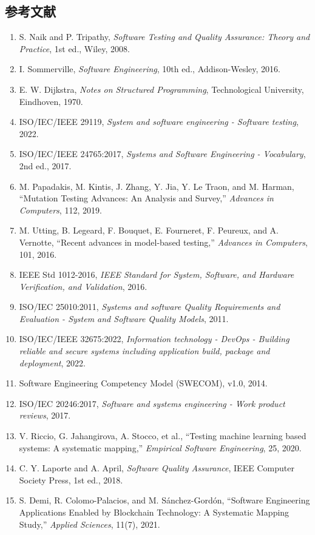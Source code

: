 \documentclass[a4paper,11pt]{ltjsarticle}
\numberwithin{figure}{section}
\numberwithin{table}{section}
\begin{document}
\subsection{参考文献}
\begin{enumerate}[leftmargin=2.2em]
\item S. Naik and P. Tripathy, \textit{Software Testing and Quality Assurance: Theory and Practice}, 1st ed., Wiley, 2008.
\item I. Sommerville, \textit{Software Engineering}, 10th ed., Addison-Wesley, 2016.
\item E. W. Dijkstra, \textit{Notes on Structured Programming}, Technological University, Eindhoven, 1970.
\item ISO/IEC/IEEE 29119, \textit{System and software engineering - Software testing}, 2022.
\item ISO/IEC/IEEE 24765:2017, \textit{Systems and Software Engineering - Vocabulary}, 2nd ed., 2017.
\item M. Papadakis, M. Kintis, J. Zhang, Y. Jia, Y. Le Traon, and M. Harman, ``Mutation Testing Advances: An Analysis and Survey,'' \textit{Advances in Computers}, 112, 2019.
\item M. Utting, B. Legeard, F. Bouquet, E. Fourneret, F. Peureux, and A. Vernotte, ``Recent advances in model-based testing,'' \textit{Advances in Computers}, 101, 2016.
\item IEEE Std 1012-2016, \textit{IEEE Standard for System, Software, and Hardware Verification, and Validation}, 2016.
\item ISO/IEC 25010:2011, \textit{Systems and software Quality Requirements and Evaluation - System and Software Quality Models}, 2011.
\item ISO/IEC/IEEE 32675:2022, \textit{Information technology - DevOps - Building reliable and secure systems including application build, package and deployment}, 2022.
\item Software Engineering Competency Model (SWECOM), v1.0, 2014.
\item ISO/IEC 20246:2017, \textit{Software and systems engineering - Work product reviews}, 2017.
\item V. Riccio, G. Jahangirova, A. Stocco, et al., ``Testing machine learning based systems: A systematic mapping,'' \textit{Empirical Software Engineering}, 25, 2020.
\item C. Y. Laporte and A. April, \textit{Software Quality Assurance}, IEEE Computer Society Press, 1st ed., 2018.
\item S. Demi, R. Colomo-Palacios, and M. Sánchez-Gordón, ``Software Engineering Applications Enabled by Blockchain Technology: A Systematic Mapping Study,'' \textit{Applied Sciences}, 11(7), 2021.

\end{enumerate}
\end{document}

